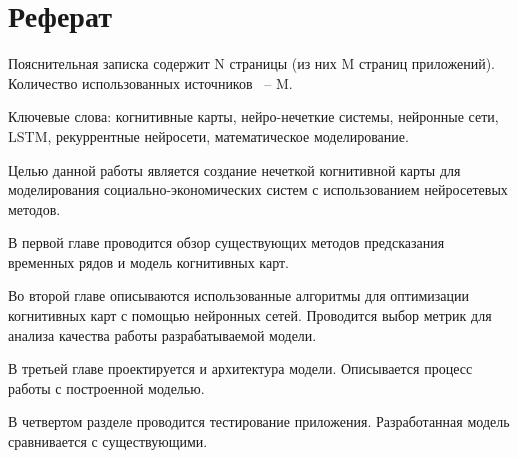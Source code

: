 \chapter*{Реферат}
\thispagestyle{plain}

Пояснительная записка содержит N страницы (из них M страниц приложений). Количество использованных источников ~-- M.

Ключевые слова: когнитивные карты, нейро-нечеткие системы,
нейронные сети, LSTM, рекуррентные нейросети, математическое моделирование.

Целью данной работы является создание нечеткой когнитивной карты для моделирования
социально-экономических систем с использованием нейросетевых методов.

В первой главе проводится обзор существующих методов предсказания временных рядов
и модель когнитивных карт.

Во второй главе описываются использованные алгоритмы для оптимизации
когнитивных карт с помощью нейронных сетей.
Проводится выбор метрик для анализа качества работы разрабатываемой модели.

В третьей главе проектируется и архитектура модели.
Описывается процесс работы с построенной моделью.

В четвертом разделе проводится тестирование приложения.
Разработанная модель сравнивается с существующими.
